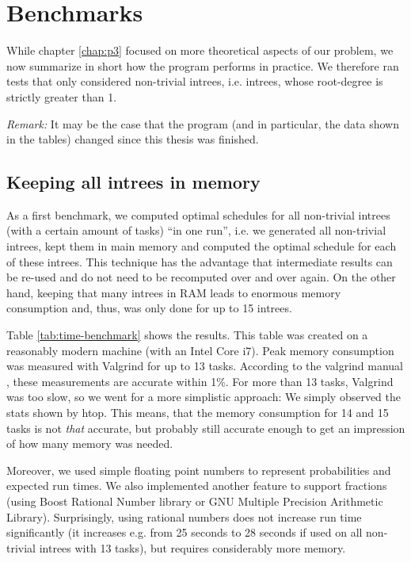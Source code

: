 \chapter{Benchmarks}
\label{chap:benchmarks}

While chapter \ref{chap:p3} focused on more theoretical aspects of our problem, we now summarize in short how the program performs in practice. We therefore ran tests that only considered non-trivial intrees, i.e. intrees, whose root-degree is strictly greater than 1.

\emph{Remark:} It may be the case that the program (and in particular, the data shown in the tables) changed since this thesis was finished.


\section{Keeping all intrees in memory}
\label{sec:benchmarks-all-intrees-in-memory}

As a first benchmark, we computed optimal schedules for all non-trivial intrees (with a certain amount of tasks) ``in one run'', i.e. we generated all non-trivial intrees, kept them in main memory and computed the optimal schedule for each of these intrees. This technique has the advantage that intermediate results can be re-used and do not need to be recomputed over and over again. On the other hand, keeping that many intrees in RAM leads to enormous memory consumption and, thus, was only done for up to 15 intrees.

Table \ref{tab:time-benchmark} shows the results. This table was created on a reasonably modern machine (with an Intel Core i7). Peak memory consumption was measured with Valgrind for up to 13 tasks. According to the valgrind manual \cite{massifmanual}, these measurements are accurate within 1\%. For more than 13 tasks, Valgrind was too slow, so we went for a more simplistic approach: We simply observed the stats shown by htop. This means, that the memory consumption for 14 and 15 tasks is not \emph{that} accurate, but probably still accurate enough to get an impression of how many memory was needed.

Moreover, we used simple floating point numbers to represent probabilities and expected run times. We also implemented another feature to support fractions (using Boost Rational Number library or GNU Multiple Precision Arithmetic Library). Surprisingly, using rational numbers does not increase run time significantly (it increases e.g. from 25 seconds to 28 seconds if used on all non-trivial intrees with 13 tasks), but requires considerably more memory.

